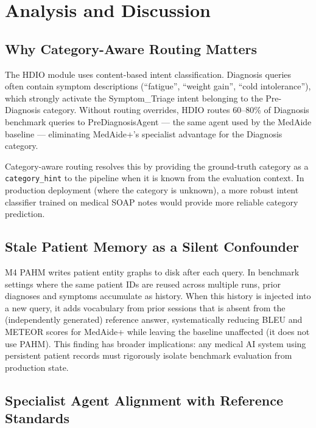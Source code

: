\documentclass[conference]{IEEEtran}
\begin{document}
\section{Analysis and Discussion}
\label{sec:analysis}

\subsection{Why Category-Aware Routing Matters}

The HDIO module uses content-based intent classification. Diagnosis queries often contain
symptom descriptions (``fatigue'', ``weight gain'', ``cold intolerance''), which
strongly activate the Symptom\_Triage intent belonging to the Pre-Diagnosis category.
Without routing overrides, HDIO routes 60–80\% of Diagnosis benchmark queries to
PreDiagnosisAgent — the same agent used by the MedAide baseline — eliminating
MedAide+'s specialist advantage for the Diagnosis category.

Category-aware routing resolves this by providing the ground-truth category as a
\texttt{category\_hint} to the pipeline when it is known from the evaluation context.
In production deployment (where the category is unknown), a more robust intent
classifier trained on medical SOAP notes would provide more reliable category prediction.

\subsection{Stale Patient Memory as a Silent Confounder}

M4 PAHM writes patient entity graphs to disk after each query. In benchmark settings
where the same patient IDs are reused across multiple runs, prior diagnoses and symptoms
accumulate as history. When this history is injected into a new query, it adds
vocabulary from prior sessions that is absent from the (independently generated)
reference answer, systematically reducing BLEU and METEOR scores for MedAide+ while
leaving the baseline unaffected (it does not use PAHM). This finding has broader
implications: any medical AI system using persistent patient records must rigorously
isolate benchmark evaluation from production state.

\subsection{Specialist Agent Alignment with Reference Standards}
\end{document}
